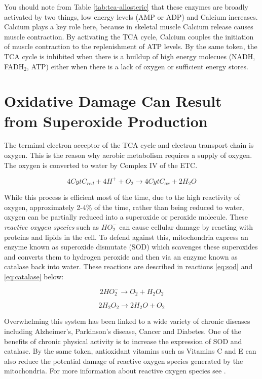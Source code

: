 \documentclass{tufte-handout}
\begin{document}
You should note from Table \ref{tab:tca-allosteric} that these enzymes are broadly activated by two things, low energy levels (AMP or ADP) and Calcium increases.  Calcium plays a key role here, because in skeletal muscle Calcium release causes muscle contraction.  By activating the TCA cycle, Calcium couples the initiation of muscle contraction to the replenishment of ATP levels.  By the same token, the TCA cycle is inhibited when there is a buildup of high energy molecues (NADH, FADH$_2$, ATP) either when there is a lack of oxygen or sufficient energy stores.

\section{Oxidative Damage Can Result from Superoxide Production}

The terminal electron acceptor of the TCA cycle and electron transport chain is oxygen.  This is the reason why aerobic metabolism requires a supply of oxygen.  The oxygen is converted to water by Complex IV of the ETC.  

\begin{equation}\label{eq:civ}
4 CytC_{red} + 4H^+ + O_2 \rightarrow 4 CytC_{ox} + 2 H_2O 
\end{equation}

While this process is efficient most of the time, due to the high reactivity of oxygen, approximately 2-4\% of the time, rather than being reduced to water, oxygen can be partially reduced into a superoxide or peroxide molecule.  These \emph{reactive oxygen species} such as $HO_2^-$ can cause cellular damage by reacting with proteins and lipids in the cell.  To defend against this, mitochondria express an enzyme known as superoxide dismutate (SOD) which scavenges these superoxides and converts them to hydrogen peroxide and then via an enzyme known as catalase back into water.  These reactions are described in reactions \ref{eq:sod} and \ref{eq:catalase} below:

\begin{equation}\label{eq:sod}
2 HO_2^- \rightarrow O_2 + H_2O_2
\end{equation}

\begin{equation}\label{eq:catalase}
2 H_2O_2 \rightarrow 2 H_2O + O_2
\end{equation}


Overwhelming this system has been linked to a wide variety of chronic diseases including Alzheimer's, Parkinson's disease, Cancer and Diabetes.  One of the benefits of chronic physical activity is to increase the expression of SOD and catalase.  By the same token, antioxidant vitamins such as Vitamins C and E can also reduce the potential damage of reactive oxygen species generated by the mitochondria.  For more information about reactive oxygen species see \citet{Turrens2003}.




\end{document}
